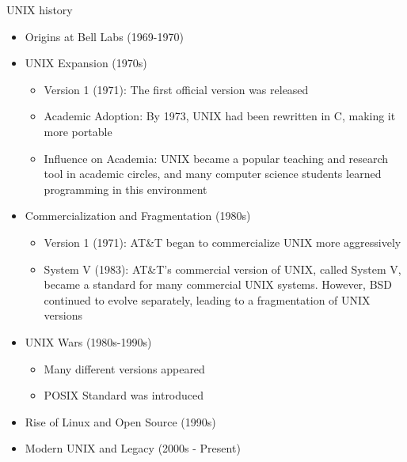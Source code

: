 \documentclass{beamer}
\begin{document}
\begin{frame}{UNIX history}
  \begin{itemize}
    \item Origins at Bell Labs (1969-1970)
    \item UNIX Expansion (1970s)
    \begin{itemize}
      \footnotesize
      \item Version 1 (1971): The first official version was released
      \item Academic Adoption: By 1973, UNIX had been rewritten in C, making it more portable
      \item Influence on Academia: UNIX became a popular teaching and research tool in academic circles, and many computer science students learned programming in this environment
    \end{itemize}
    \item Commercialization and Fragmentation (1980s)
    \begin{itemize}
      \footnotesize
      \item Version 1 (1971): AT\&T began to commercialize UNIX more aggressively
      \item System V (1983): AT\&T's commercial version of UNIX, called System V, became a standard for many commercial UNIX systems. However, BSD continued to evolve separately, leading to a fragmentation of UNIX versions
    \end{itemize}
    \item UNIX Wars (1980s-1990s)
    \begin{itemize}
      \footnotesize
      \item Many different versions appeared
      \item POSIX Standard was introduced
    \end{itemize}
    \item Rise of Linux and Open Source (1990s)
    \item Modern UNIX and Legacy (2000s - Present)
  \end{itemize}
\end{frame}
\end{document}
